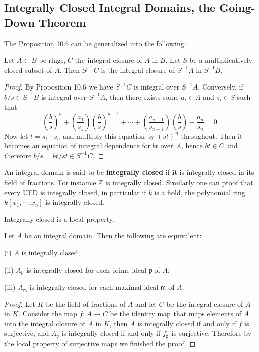 \subsection{Integrally Closed Integral Domains, the Going-Down Theorem}
The Proposition 10.6 can be generalized into the following:
\begin{proposition}
Let $A\subset B$ be rings, $C$ the integral closure of $A$ in $B$. Let $S$ be a multiplicatively closed subset of $A$. Then $S^{-1}C$ is the integral closure of $S^{-1}A$ in $S^{-1}B$.
\end{proposition}
\begin{proof}
By Proposition 10.6 we have $S^{-1}C$ is integral over $S^{-1}A$. Conversely, if $b/s\in S^{-1}B$ is integral over $S^{-1}A$, then there exists some $a_i\in A$ and $s_i\in S$ such that 
$$
\left( \frac{b}{s} \right) ^n+\left( \frac{a_1}{s_1} \right) \left( \frac{b}{s} \right) ^{n-1}+\cdots +\left( \frac{a_{n-1}}{s_{n-1}} \right) \left( \frac{b}{s} \right) +\frac{a_n}{s_n}=0.
$$
Now let $t=s_1\cdots s_n$ and multiply this equation by $(st)^n$ throughout. Then it becomes an equation of integral dependence for $bt$ over $A$, hence $bt\in C$ and therefore $b/s=bt/st\in S^{-1}C$.
\end{proof}
An integral domain is said to be \textbf{integrally closed} if it is integrally closed in its field of fractions. For instance $\mathbb{Z}$ is integrally closed. Similarly one can proof that every UFD is integrally closed, in particular if $k$ is a field, the polynomial ring $k[x_1,\cdots,x_n]$ is integrally closed.\par
Integrally closed is a local property.
\begin{proposition}
Let $A$ be an integral domain. Then the following are equivalent:\par
(i) $A$ is integrally closed;\par
(ii) $A_\mathfrak{p}$ is integrally closed for each prime ideal $\mathfrak{p}$ of $A$;\par
(iii) $A_\mathfrak{m}$ is integrally closed for each maximal ideal $\mathfrak{m}$ of $A$.
\end{proposition}
\begin{proof}
Let $K$ be the field of fractions of $A$ and let $C$ be the integral closure of $A$ in $K$. Consider the map $f:A\to C$ be the identity map that maps elements of $A$ into the integral closure of $A$ in $K$, then $A$ is integrally closed if and only if $f$ is surjective, and $A_\mathfrak{p}$ is integrally closed if and only if $f_\mathfrak{p}$ is surjective. Therefore by the local property of surjective maps we finished the proof.
\end{proof}
